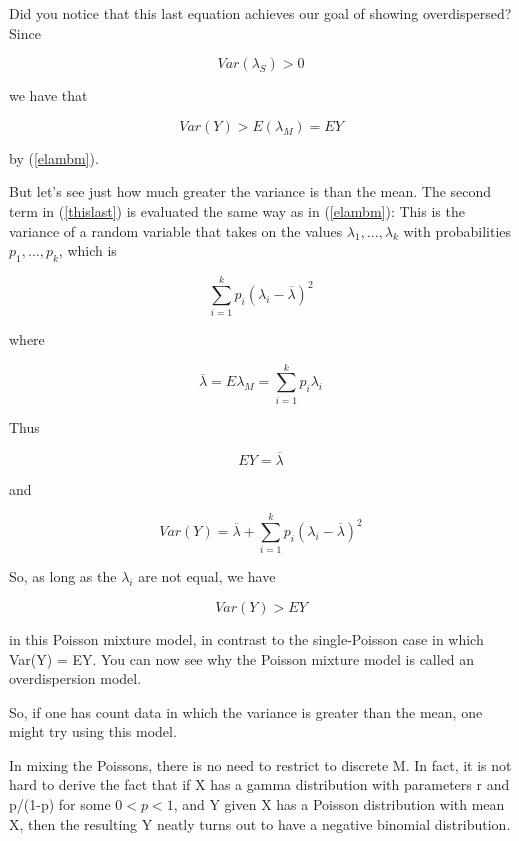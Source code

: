 \documentclass[11pt]{article}
\begin{document}
Did you notice that this last equation achieves our goal of showing
overdispersed?  Since

\begin{equation}
Var(\lambda_S) > 0
\end{equation}

we have that

\begin{equation}
Var(Y) > E(\lambda_M) = EY
\end{equation}

by (\ref{elambm}).

But let's see just how much greater the variance is than the mean.  The
second term in (\ref{thislast}) is evaluated the same way as in
(\ref{elambm}):  This is the variance of a random variable that takes on
the values $\lambda_1,...,\lambda_k$ with probabilities $p_1,...,p_k$,
which is

\begin{equation}
\sum_{i=1}^k p_i (\lambda_i - \overline{\lambda})^2
\end{equation}

where 

\begin{equation}
\overline{\lambda} =  E\lambda_M = \sum_{i=1}^k p_i \lambda_i
\end{equation}

Thus

\begin{equation}
EY = \overline{\lambda}
\end{equation}

and

\begin{equation}
Var(Y) = \overline{\lambda} + 
\sum_{i=1}^k p_i (\lambda_i - \overline{\lambda})^2
\end{equation}

So, as long as the $\lambda_i$ are not equal, we have

\begin{equation}
Var(Y) > EY
\end{equation}

in this Poisson mixture model, in contrast to the single-Poisson case
in which Var(Y) = EY.  You can now see why the Poisson mixture model is
called an overdispersion model.

So, if one has count data in which the variance is greater than the
mean, one might try using this model.

In mixing the Poissons, there is no need to restrict to discrete M.  In
fact, it is not hard to derive the fact that if X has a gamma
distribution with parameters r and p/(1-p) for some $0 < p < 1$, and Y
given X has a Poisson distribution with mean X, then the resulting Y
neatly turns out to have a negative binomial distribution.
\end{document}
